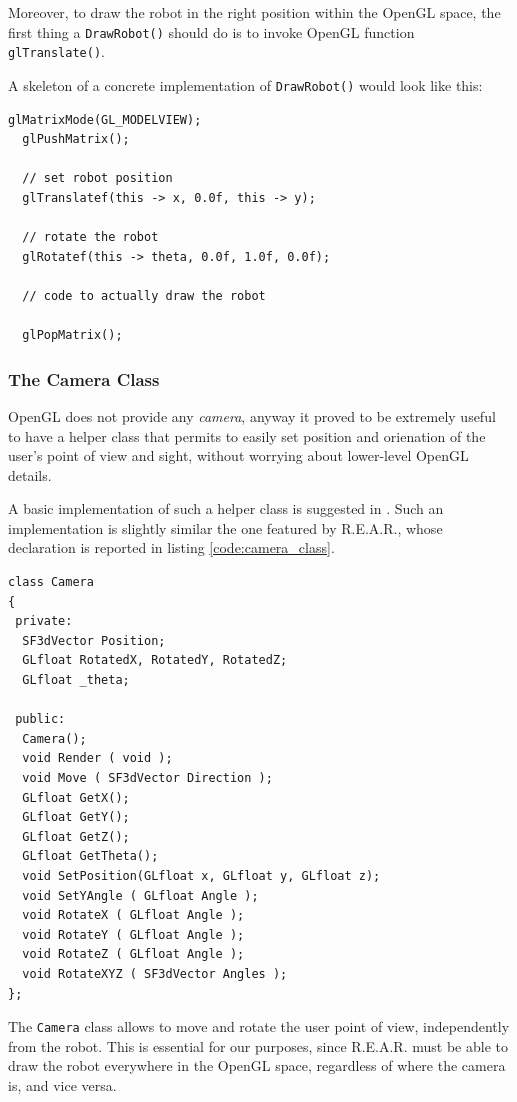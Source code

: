 %
Moreover, to draw the robot in the right position within 
the OpenGL space, the first thing a \texttt{DrawRobot()} should 
do is to invoke OpenGL function \texttt{glTranslate()}.
%

%
A skeleton of a concrete implementation of \texttt{DrawRobot()}
would look like this:
\begin{lstlisting}[caption={\texttt{Robot} class declaration}, label={code:robot_class}, frame=trBL]  
  glMatrixMode(GL_MODELVIEW);
  glPushMatrix();

  // set robot position
  glTranslatef(this -> x, 0.0f, this -> y);

  // rotate the robot 
  glRotatef(this -> theta, 0.0f, 1.0f, 0.0f);

  // code to actually draw the robot

  glPopMatrix();
\end{lstlisting}
%

%
\subsubsection{The Camera Class}
\label{sub:cameraclass}

OpenGL does not provide any \textit{camera}, anyway it proved 
to be extremely useful to have a helper class that permits 
to easily set position and orienation of the user's 
point of view and sight, without worrying about lower-level 
OpenGL details.
%

%
A basic implementation of such a helper class is suggested 
in \cite{opengl:camera}. Such an implementation is slightly 
similar the one featured by \textsf{R.E.A.R.}, whose 
declaration is reported in listing \ref{code:camera_class}.
%
\begin{lstlisting}[caption={\texttt{Camera} class declaration}, label={code:camera_class}, frame=trBL]
class Camera
{
 private:
  SF3dVector Position;
  GLfloat RotatedX, RotatedY, RotatedZ;	
  GLfloat _theta;

 public:
  Camera();
  void Render ( void );
  void Move ( SF3dVector Direction );
  GLfloat GetX();
  GLfloat GetY();
  GLfloat GetZ();
  GLfloat GetTheta();
  void SetPosition(GLfloat x, GLfloat y, GLfloat z);
  void SetYAngle ( GLfloat Angle );
  void RotateX ( GLfloat Angle );
  void RotateY ( GLfloat Angle );
  void RotateZ ( GLfloat Angle );
  void RotateXYZ ( SF3dVector Angles );
};
\end{lstlisting}
%
The \texttt{Camera} class allows to move and rotate the user 
point of view, independently from the robot.
%
This is essential for our purposes, since \textsf{R.E.A.R.}
must be able to draw the robot everywhere in the OpenGL space, 
regardless of where the camera is, and vice versa.
%

